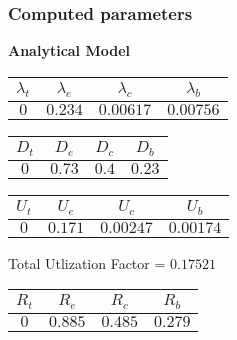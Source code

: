 \documentclass{article}
\begin{document}
\subsubsection{Computed parameters}
\begin{minipage}{0.5\textwidth}
\centering	\textbf{Analytical Model}
\begin{table}[H]
\centering
\begin{tabular}{@{}cccc@{}}
\toprule
$\lambda_t$ & $\lambda_e$ & $\lambda_c$ & $\lambda_b$\\
\midrule
$0$ & $0.234$ & $0.00617$ & $0.00756$\\
\bottomrule
\end{tabular}
\end{table}\begin{table}[H]
\centering
\begin{tabular}{@{}cccc@{}}
\toprule
$D_t$ & $D_e$ & $D_c$ & $D_b$\\
\midrule
$0$ & $0.73$ & $0.4$ & $0.23$\\
\bottomrule
\end{tabular}
\end{table}\begin{table}[H]
\centering
\begin{tabular}{@{}cccc@{}}
\toprule
$U_t$ & $U_e$ & $U_c$ & $U_b$\\
\midrule
$0$ & $0.171$ & $0.00247$ & $0.00174$\\
\bottomrule
\end{tabular}
\end{table}
\centering Total Utlization Factor = $0.17521$
\begin{table}[H]
\centering
\begin{tabular}{@{}cccc@{}}
\toprule
$R_t$ & $R_e$ & $R_c$ & $R_b$\\
\midrule
$0$ & $0.885$ & $0.485$ & $0.279$\\
\bottomrule
\end{tabular}
\end{table}
\end{minipage}
\end{document}
